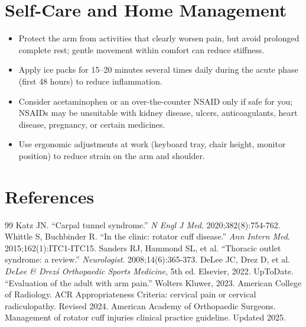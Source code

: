 \section*{Self-Care and Home Management}
\begin{itemize}
 \item Protect the arm from activities that clearly worsen pain, but avoid prolonged complete rest; gentle movement within comfort can reduce stiffness.
 \item Apply ice packs for 15–20 minutes several times daily during the acute phase (first 48 hours) to reduce inflammation.
 \item Consider acetaminophen or an over-the-counter NSAID only if safe for you; NSAIDs may be unsuitable with kidney disease, ulcers, anticoagulants, heart disease, pregnancy, or certain medicines.
 \item Use ergonomic adjustments at work (keyboard tray, chair height, monitor position) to reduce strain on the arm and shoulder.
\end{itemize}

\section*{References}
\begin{thebibliography}{99}
 Katz JN. ``Carpal tunnel syndrome.'' \textit{N Engl J Med}. 2020;382(8):754-762.
 Whittle S, Buchbinder R. ``In the clinic: rotator cuff disease.'' \textit{Ann Intern Med}. 2015;162(1):ITC1-ITC15.
 Sanders RJ, Hammond SL, et al. ``Thoracic outlet syndrome: a review.'' \textit{Neurologist}. 2008;14(6):365-373.
 DeLee JC, Drez D, et al. \textit{DeLee \& Drez\'s Orthopaedic Sports Medicine}, 5th ed. Elsevier, 2022.
 UpToDate. ``Evaluation of the adult with arm pain.'' Wolters Kluwer, 2023.
 American College of Radiology. ACR Appropriateness Criteria: cervical pain or cervical radiculopathy. Revised 2024.
 American Academy of Orthopaedic Surgeons. Management of rotator cuff injuries clinical practice guideline. Updated 2025.
\end{thebibliography}
